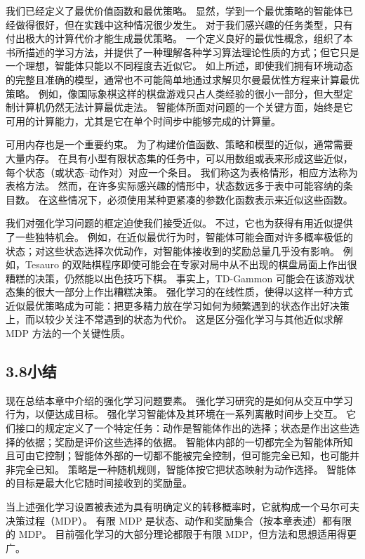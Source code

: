 \documentclass[UTF8,12pt,a4paper,fontset=fandol]{ctexart}
\begin{document}
我们已经定义了最优价值函数和最优策略。
显然，学到一个最优策略的智能体已经做得很好，但在实践中这种情况很少发生。
对于我们感兴趣的任务类型，只有付出极大的计算代价才能生成最优策略。
一个定义良好的最优性概念，组织了本书所描述的学习方法，并提供了一种理解各种学习算法理论性质的方式；但它只是一个理想，智能体只能以不同程度去近似它。
如上所述，即使我们拥有环境动态的完整且准确的模型，通常也不可能简单地通过求解贝尔曼最优性方程来计算最优策略。
例如，像国际象棋这样的棋盘游戏只占人类经验的很小一部分，但大型定制计算机仍然无法计算最优走法。
智能体所面对问题的一个关键方面，始终是它可用的计算能力，尤其是它在单个时间步中能够完成的计算量。

可用内存也是一个重要约束。
为了构建价值函数、策略和模型的近似，通常需要大量内存。
在具有小型有限状态集的任务中，可以用数组或表来形成这些近似，每个状态（或状态--动作对）对应一个条目。
我们称这为表格情形，相应方法称为表格方法。
然而，在许多实际感兴趣的情形中，状态数远多于表中可能容纳的条目数。
在这些情况下，必须使用某种更紧凑的参数化函数表示来近似这些函数。

我们对强化学习问题的框定迫使我们接受近似。
不过，它也为获得有用近似提供了一些独特机会。
例如，在近似最优行为时，智能体可能会面对许多概率极低的状态；对这些状态选择次优动作，对智能体接收到的奖励总量几乎没有影响。
例如，Tesauro 的双陆棋程序即使可能会在专家对局中从不出现的棋盘局面上作出很糟糕的决策，仍然能以出色技巧下棋。
事实上，TD-Gammon 可能会在该游戏状态集的很大一部分上作出糟糕决策。
强化学习的在线性质，使得以这样一种方式近似最优策略成为可能：把更多精力放在学习如何为频繁遇到的状态作出好决策上，而以较少关注不常遇到的状态为代价。
这是区分强化学习与其他近似求解 MDP 方法的一个关键性质。

\subsection*{3.8\quad 小结}

现在总结本章中介绍的强化学习问题要素。
强化学习研究的是如何从交互中学习行为，以便达成目标。
强化学习智能体及其环境在一系列离散时间步上交互。
它们接口的规定定义了一个特定任务：动作是智能体作出的选择；状态是作出这些选择的依据；奖励是评价这些选择的依据。
智能体内部的一切都完全为智能体所知且可由它控制；智能体外部的一切都不能被完全控制，但可能完全已知，也可能并非完全已知。
策略是一种随机规则，智能体按它把状态映射为动作选择。
智能体的目标是最大化它随时间接收到的奖励量。

当上述强化学习设置被表述为具有明确定义的转移概率时，它就构成一个马尔可夫决策过程（MDP）。
有限 MDP 是状态、动作和奖励集合（按本章表述）都有限的 MDP。
目前强化学习的大部分理论都限于有限 MDP，但方法和思想适用得更广。
\end{document}
